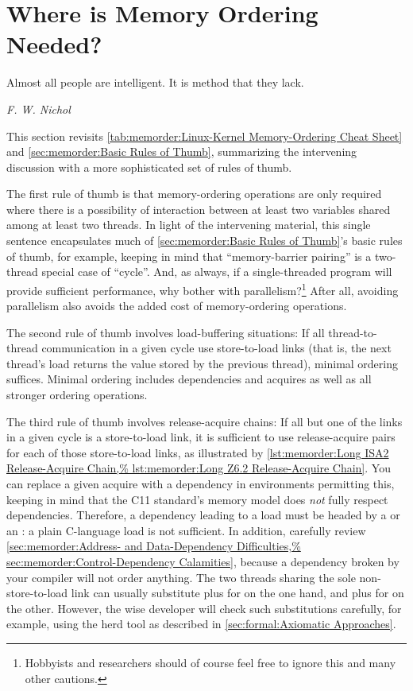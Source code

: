 \section{Where is Memory Ordering Needed?}
\label{sec:memorder:Where is Memory Ordering Needed?}
%
\epigraph{Almost all people are intelligent.
	  It is method that they lack.}
	 {\emph{F. W. Nichol}}

This section revisits
\cref{tab:memorder:Linux-Kernel Memory-Ordering Cheat Sheet}
and \cref{sec:memorder:Basic Rules of Thumb},
summarizing the intervening discussion with a more sophisticated
set of rules of thumb.

The first rule of thumb is that memory-ordering operations are only
required where there is a possibility of interaction between at least
two variables shared among at least two threads.
In light of the intervening material, this single sentence encapsulates much of
\cref{sec:memorder:Basic Rules of Thumb}'s basic rules of thumb,
for example, keeping in mind that ``memory-barrier pairing'' is a
two-thread special case of ``cycle''.
And, as always, if a single-threaded program will provide sufficient
performance, why bother with parallelism?\footnote{
	Hobbyists and researchers should of course feel free to ignore
	this and many other cautions.}
After all, avoiding parallelism also avoids the added cost of
memory-ordering operations.

The second rule of thumb involves load-buffering situations:
If all thread-to-thread communication in a given cycle use store-to-load
links (that is, the next thread's load returns the value stored by
the previous thread), minimal ordering suffices.
Minimal ordering includes dependencies and acquires as well as all stronger
ordering operations.

The third rule of thumb involves release-acquire chains:
If all but one of the links in a given cycle is a store-to-load
link, it is sufficient to use release-acquire pairs for each of
those store-to-load links, as illustrated by
\cref{lst:memorder:Long ISA2 Release-Acquire Chain,%
lst:memorder:Long Z6.2 Release-Acquire Chain}.
You can replace a given acquire with a dependency in environments permitting
this, keeping in mind that the C11 standard's memory model does \emph{not}
fully respect dependencies.
Therefore, a dependency leading to a load must be headed by
a  or an :
a plain C-language load is not sufficient.
In addition, carefully review
\cref{sec:memorder:Address- and Data-Dependency Difficulties,%
sec:memorder:Control-Dependency Calamities}, because
a dependency broken by your compiler will not order anything.
The two threads sharing the sole non-store-to-load link can
usually substitute  plus  for
 on the one hand,
and  plus  for 
on the other.
However, the wise developer will check such substitutions carefully,
for example, using the herd tool as described in
\cref{sec:formal:Axiomatic Approaches}.

